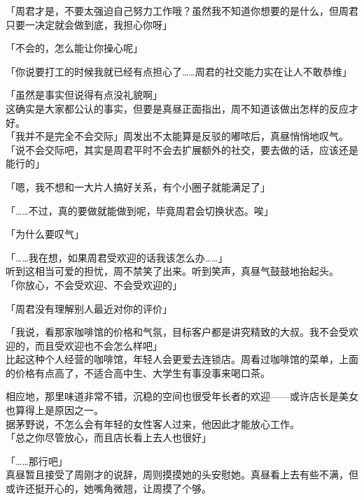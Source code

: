 「周君才是，不要太强迫自己努力工作哦？虽然我不知道你想要的是什么，但周君只要一决定就会做到底，我担心你呀」

「不会的，怎么能让你操心呢」

「你说要打工的时候我就已经有点担心了……周君的社交能力实在让人不敢恭维」

「虽然是事实但说得有点没礼貌啊」\\

这确实是大家都公认的事实，但要是真昼正面指出，周不知道该做出怎样的反应才好。\\

「我并不是完全不会交际」周发出不太能算是反驳的嘟哝后，真昼悄悄地叹气。\\

「说不会交际吧，其实是周君平时不会去扩展额外的社交，要去做的话，应该还是能行的」

「嗯，我不想和一大片人搞好关系，有个小圈子就能满足了」

「……不过，真的要做就能做到呢，毕竟周君会切换状态。唉」

「为什么要叹气」

「……我在想，如果周君受欢迎的话我该怎么办……」\\

听到这相当可爱的担忧，周不禁笑了出来。听到笑声，真昼气鼓鼓地抬起头。\\

「你放心，不会受欢迎、不会受欢迎的」

「周君没有理解别人最近对你的评价」

「我说，看那家咖啡馆的价格和气氛，目标客户都是讲究精致的大叔。我不会受欢迎的，而且受欢迎也不会怎么样吧」\\

比起这种个人经营的咖啡馆，年轻人会更爱去连锁店。周看过咖啡馆的菜单，上面的价格有点高了，不适合高中生、大学生有事没事来喝口茶。

相应地，那里味道非常不错，沉稳的空间也很受年长者的欢迎——或许店长是美女也算得上是原因之一。\\

据茅野说，不怎么会有年轻的女性客人过来，他因此才能放心工作。\\

「总之你尽管放心，而且店长看上去人也很好」

「……那行吧」\\

真昼暂且接受了周刚才的说辞，周则摸摸她的头安慰她。真昼看上去有些不满，但或许还挺开心的，她嘴角微翘，让周摸了个够。
